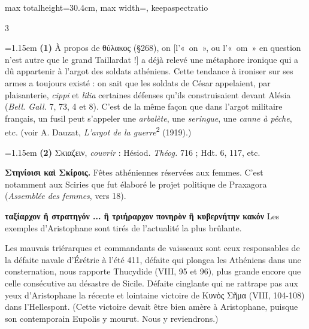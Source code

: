 \documentclass[11pt,twoside]{book}
\newcommand{\italique}[1]{\textit{#1}}
\newcommand{\expo}[1]{\textsuperscript{#1}}
\newcommand{\latin}[1]{\textit{#1}}
\begin{document}
\begin{adjustbox}{max totalheight=30.4cm, max width=\textwidth, keepaspectratio}
\begin{minipage}{\textwidth}
{\begin{multicols}{3}
\par\vspace{1.2pt}\par\nopagebreak\vspace{1pt}\noindent\hangindent=1.15em {\color{sepiaNote}\textbf{(1)}} À propos de θύλακος (§268), on [l'«~on~», ou l'«~om~» en question n'est autre que le grand Taillardat !] a déjà relevé une métaphore ironique qui a dû appartenir à l'argot des soldats athéniens. Cette tendance à ironiser sur ses armes a toujours existé : on sait que les soldats de César appelaient, par plaisanterie, \latin{cippi} et \latin{lilia} certaines défenses qu'ils construisaient devant Alésia (\italique{Bell. Gall.} 7, 73, 4 et 8). C'est de la même façon que dans l'argot militaire français, un fusil peut s'appeler une \italique{arbalète}, une \italique{seringue}, une \italique{canne à pêche}, etc. (voir A. Dauzat, \italique{L'argot de la guerre}\expo{2} (1919).)
\par\vspace{1.5pt}
\noindent\hangindent=1.15em {\color{sepiaNote}\textbf{(2)}} Σκιαζειν, \italique{couvrir} : Hésiod. \italique{Théog.} 716 ; Hdt. 6, 117, etc.
\par\vspace{1.5pt}
 \textbf{Στηνίοισι καὶ Σκίροις.} Fêtes athéniennes réservées aux femmes. C'est notamment aux Sciries que fut élaboré le projet politique de Praxagora (\italique{Assemblée des femmes}, vers 18).
\par\vspace{1.5pt}
 \textbf{ταξίαρχον ἢ στρατηγόν ... ἢ τριήραρχον πονηρὸν ἢ κυβερνήτην κακόν} Les exemples d'Aristophane sont tirés de l'actualité la plus brûlante.
\par\vspace{1.5pt}
\noindent Les mauvais triérarques et commandants de vaisseaux sont ceux responsables de la défaite navale d'Érétrie à l'été 411, défaite qui plongea les Athéniens dans une consternation, nous rapporte Thucydide (VIII, 95 et 96), plus grande encore que celle consécutive au désastre de Sicile. Défaite cinglante qui ne rattrape pas aux yeux d'Aristophane la récente et lointaine victoire de Κυνὸς Σῆμα (VIII, 104-108) dans l'Hellespont. (Cette victoire devait être bien amère à Aristophane, puisque son contemporain Eupolis y mourut. Nous y reviendrons.)
\par\end{multicols}}
\end{minipage}\end{adjustbox}
\end{document}
